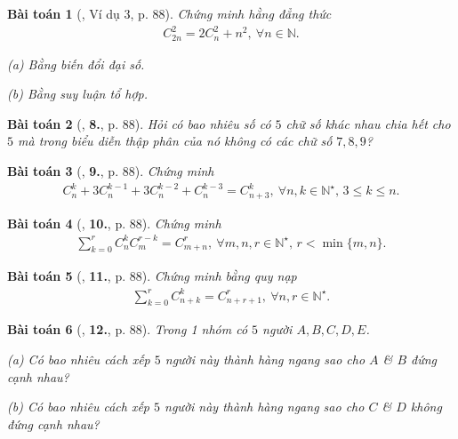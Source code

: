 \documentclass{article}
\numberwithin{equation}{section}
\newtheorem{baitoan}{Bài toán}[section]
\begin{document}
\begin{baitoan}[\cite{TL_chuyen_Toan_Dai_So_Giai_Tich_11}, Ví dụ 3, p. 88]
	Chứng minh hằng đẳng thức
	\begin{align*}
		C_{2n}^2 = 2C_n^2 + n^2,\ \forall n\in\mathbb{N}.
	\end{align*}
	\begin{enumerate*}
		\item[(a)] Bằng biến đổi đại số.
		\item[(b)] Bằng suy luận tổ hợp.
	\end{enumerate*}
\end{baitoan}

\begin{baitoan}[\cite{TL_chuyen_Toan_Dai_So_Giai_Tich_11}, \textbf{8.}, p. 88]
	Hỏi có bao nhiêu số có $5$ chữ số khác nhau chia hết cho $5$ mà trong biểu diễn thập phân của nó không có các chữ số $7,8,9$?
\end{baitoan}

\begin{baitoan}[\cite{TL_chuyen_Toan_Dai_So_Giai_Tich_11}, \textbf{9.}, p. 88]
	Chứng minh
	\begin{align*}
		C_n^k + 3C_n^{k-1} + 3C_n^{k-2} + C_n^{k-3} = C_{n+3}^k,\ \forall n,k\in\mathbb{N}^\star,\,3\le k\le n.
	\end{align*}
\end{baitoan}

\begin{baitoan}[\cite{TL_chuyen_Toan_Dai_So_Giai_Tich_11}, \textbf{10.}, p. 88]
	Chứng minh
	\begin{align*}
		\sum_{k=0}^r C_n^kC_m^{r-k} = C_{m+n}^r,\ \forall m,n,r\in\mathbb{N}^\star,\,r < \min\{m,n\}.
	\end{align*}
\end{baitoan}

\begin{baitoan}[\cite{TL_chuyen_Toan_Dai_So_Giai_Tich_11}, \textbf{11.}, p. 88]
	Chứng minh bằng quy nạp
	\begin{align*}
		\sum_{k=0}^r C_{n+k}^k = C_{n+r+1}^r,\ \forall n,r\in\mathbb{N}^\star.
	\end{align*}
\end{baitoan}

\begin{baitoan}[\cite{TL_chuyen_Toan_Dai_So_Giai_Tich_11}, \textbf{12.}, p. 88]
	Trong 1 nhóm có $5$ người $A,B,C,D,E$.
	\begin{enumerate*}
		\item[(a)] Có bao nhiêu cách xếp $5$ người này thành hàng ngang sao cho $A$ \& $B$ đứng cạnh nhau?
		\item[(b)] Có bao nhiêu cách xếp $5$ người này thành hàng ngang sao cho $C$ \& $D$ không đứng cạnh nhau?
	\end{enumerate*}
\end{baitoan}
\end{document}
